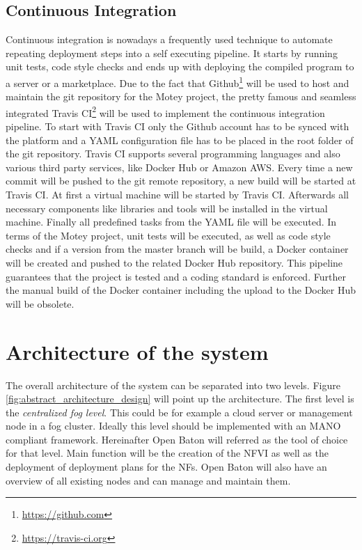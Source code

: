\subsection{Continuous Integration}
Continuous integration is nowadays a frequently used technique to automate repeating deployment steps into a self executing pipeline.
It starts by running unit tests, code style checks and ends up with deploying the compiled program to a server or a marketplace.
Due to the fact that Github\footnote{\url{https://github.com}} will be used to host and maintain the git repository for the Motey project, the pretty famous and seamless integrated Travis CI\footnote{\url{https://travis-ci.org}} will be used to implement the continuous integration pipeline.
To start with Travis CI only the Github account has to be synced with the platform and a \ac{YAML} configuration file has to be placed in the root folder of the git repository.
Travis CI supports several programming languages and also various third party services, like Docker Hub or Amazon AWS.
Every time a new commit will be pushed to the git remote repository, a new build will be started at Travis CI.
At first a virtual machine will be started by Travis CI.
Afterwards all necessary components like libraries and tools will be installed in the virtual machine.
Finally all predefined tasks from the \ac{YAML} file will be executed.
In terms of the Motey project, unit tests will be executed, as well as code style checks and if a version from the master branch will be build, a Docker container will be created and pushed to the related Docker Hub repository.
This pipeline guarantees that the project is tested and a coding standard is enforced.
Further the manual build of the Docker container including the upload to the Docker Hub will be obsolete.


\section{Architecture of the system}
The overall architecture of the system can be separated into two levels.
Figure \ref{fig:abstract_architecture_design} will point up the architecture.
The first level is the \textit{centralized fog level}.
This could be for example a cloud server or management node in a fog cluster.
Ideally this level should be implemented with an \ac{MANO} compliant framework.
Hereinafter Open Baton will referred as the tool of choice for that level.
Main function will be the creation of the \ac{NFVI} as well as the deployment of deployment plans for the \acp{NF}.
Open Baton will also have an overview of all existing nodes and can manage and maintain them.


